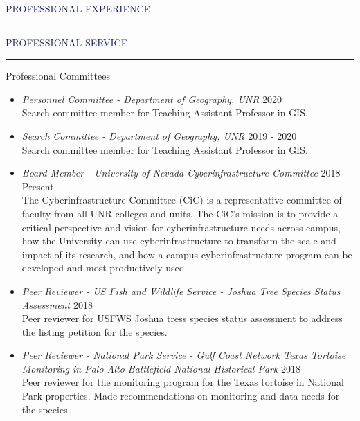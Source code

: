 \documentclass{resume} %
\renewenvironment{rSection}[1]{
\sectionskip
\textcolor{MidnightBlue}{\MakeUppercase{#1}}
\sectionlineskip
\hrule
\begin{list}{}{
\setlength{\leftmargin}{1.5em}
}
\item[]
}{
\end{list}
}
\begin{document}
\begin{rSection}{Professional Experience}
\begin{rSection}{Professional Service}
\begin{rSubsection}{Professional Committees}{}{}{}
\begin{itemize}
\item \textit{Personnel Committee - Department of Geography, UNR} \hfill 2020 \\
Search committee member for Teaching Assistant Professor in GIS.
\item \textit{Search Committee - Department of Geography, UNR} \hfill 2019 - 2020 \\
Search committee member for Teaching Assistant Professor in GIS.
\item \textit{Board Member - University of Nevada Cyberinfrastructure Committee} \hfill 2018 - Present \\
The Cyberinfrastructure Committee (CiC) is a representative committee of faculty from all UNR colleges and units. The CiC's mission is to provide a critical perspective and vision for cyberinfrastructure needs across campus, how the University can use cyberinfrastructure to transform the scale and impact of its research, and how a campus cyberinfrastructure program can be developed and most productively used.

\item \textit{Peer Reviewer - US Fish and Wildlife Service - Joshua Tree Species Status Assessment} \hfill 2018 \\
Peer reviewer for USFWS Joshua tress species status assessment to address the listing petition for the species. 
\item \textit{Peer Reviewer - National Park Service - Gulf Coast Network Texas Tortoise Monitoring in Palo Alto Battlefield National Historical Park
} \hfill 2018 \\
Peer reviewer for the monitoring program for the Texas tortoise in National Park properties. Made recommendations on monitoring and data needs for the species.


\end{itemize}
\end{rSubsection}
\end{rSection}
\end{rSection}
\end{document}
